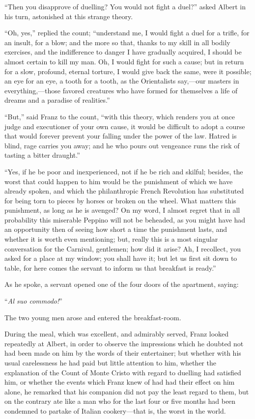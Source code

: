 “Then you disapprove of duelling? You would not fight a duel?” asked
Albert in his turn, astonished at this strange theory.

“Oh, yes,” replied the count; “understand me, I would fight a duel for
a trifle, for an insult, for a blow; and the more so that, thanks to my
skill in all bodily exercises, and the indifference to danger I have
gradually acquired, I should be almost certain to kill my man. Oh, I
would fight for such a cause; but in return for a slow, profound,
eternal torture, I would give back the same, were it possible; an eye
for an eye, a tooth for a tooth, as the Orientalists say,—our masters
in everything,—those favored creatures who have formed for themselves a
life of dreams and a paradise of realities.”

“But,” said Franz to the count, “with this theory, which renders you at
once judge and executioner of your own cause, it would be difficult to
adopt a course that would forever prevent your falling under the power
of the law. Hatred is blind, rage carries you away; and he who pours
out vengeance runs the risk of tasting a bitter draught.”

“Yes, if he be poor and inexperienced, not if he be rich and skilful;
besides, the worst that could happen to him would be the punishment of
which we have already spoken, and which the philanthropic French
Revolution has substituted for being torn to pieces by horses or broken
on the wheel. What matters this punishment, as long as he is avenged?
On my word, I almost regret that in all probability this miserable
Peppino will not be beheaded, as you might have had an opportunity then
of seeing how short a time the punishment lasts, and whether it is
worth even mentioning; but, really this is a most singular conversation
for the Carnival, gentlemen; how did it arise? Ah, I recollect, you
asked for a place at my window; you shall have it; but let us first sit
down to table, for here comes the servant to inform us that breakfast
is ready.”

As he spoke, a servant opened one of the four doors of the apartment,
saying:

“\textit{Al suo commodo!}”

The two young men arose and entered the breakfast-room.

During the meal, which was excellent, and admirably served, Franz
looked repeatedly at Albert, in order to observe the impressions which
he doubted not had been made on him by the words of their entertainer;
but whether with his usual carelessness he had paid but little
attention to him, whether the explanation of the Count of Monte Cristo
with regard to duelling had satisfied him, or whether the events which
Franz knew of had had their effect on him alone, he remarked that his
companion did not pay the least regard to them, but on the contrary ate
like a man who for the last four or five months had been condemned to
partake of Italian cookery—that is, the worst in the world.

